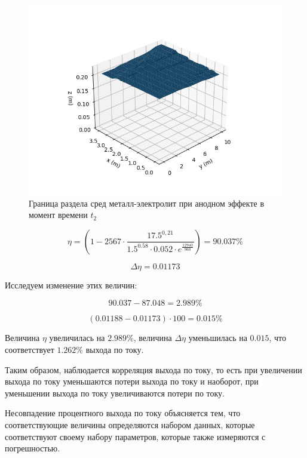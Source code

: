 \documentclass{article}
\begin{document}
\begin{figure}[H]
\centering
\includegraphics[width=0.8\linewidth]{anodeffect-.png}
\caption{Граница раздела сред металл-электролит при анодном эффекте в момент времени $t_2$ \label{fig:anodeffect-}}
\end{figure}

\begin{equation}
\eta=(1-2567 \cdot \frac{17.5^{0,21}}{1.5^{0.58} \cdot 0.052 \cdot e^{\frac{12940}{960}}}) = 90.037 \%
\end{equation}

\begin{equation}
\Delta \eta = 0.01173
\end{equation}

Исследуем изменение этих величин:

\begin{equation}
90.037 - 87.048 = 2.989 \%
\end{equation}

\begin{equation}
(0.01188 - 0.01173) \cdot 100 = 0.015 \%
\end{equation}

Величина $\eta$ увеличилась на $2.989\%$, величина $\Delta \eta$ уменьшилась на $0.015$, что соответствует $1.262\%$ выхода по току.

Таким образом, наблюдается корреляция выхода по току, то есть при увеличении выхода по току уменьшаются потери выхода по току и наоборот, при уменьшении выхода по току увеличиваются потери по току.

Несовпадение процентного выхода по току объясняется тем, что соответствующие величины определяются набором данных, которые соответствуют своему набору параметров, которые также измеряются с погрешностью.
\end{document}
